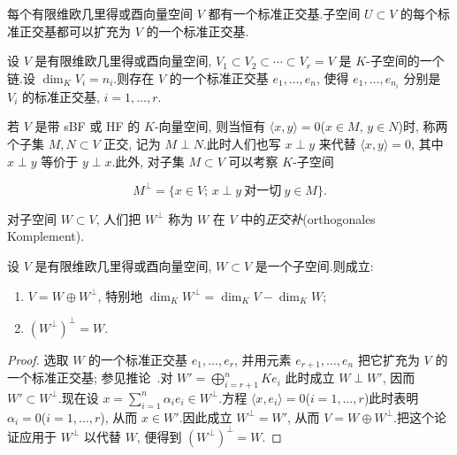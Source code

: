 \begin{corollary}\label{cor:7.2.6}
每个有限维欧几里得或酉向量空间 $V$ 都有一个标准正交基.子空间 $U \subset V$ 的每个标准正交基都可以扩充为 $V$ 的一个标准正交基.
\end{corollary}

\begin{corollary}\label{cor:7.2.7}
设 $V$ 是有限维欧几里得或酉向量空间, $V_1 \subset V_2 \subset \cdots \subset V_r = V$ 是 $K$-子空间的一个链.设 $\dim_K V_i = n_i$.则存在 $V$ 的一个标准正交基 $e_1, \ldots, e_n$, 使得 $e_1, \ldots, e_{n_i}$ 分别是 $V_i$ 的标准正交基, $i = 1, \ldots, r$.
\end{corollary}

若 $V$ 是带 sBF 或 HF 的 $K$-向量空间, 则当恒有 $\langle x, y \rangle = 0$($x \in M$, $y \in N$)时, 称两个子集 $M, N \subset V$ 正交, 记为 $M \perp N$.此时人们也写 $x \perp y$ 来代替 $\langle x, y \rangle = 0$, 其中 $x \perp y$ 等价于 $y \perp x$.此外, 对子集 $M \subset V$ 可以考察 $K$-子空间

\[
M^{\perp} = \bigl\{x \in V;\, x \perp y \ \text{对一切} \ y \in M\bigr\}\text{.}
\]

对子空间 $W \subset V$, 人们把 $W^{\perp}$ 称为 $W$ 在 $V$ 中的\emph{正交补}(\textup{orthogonales Komplement}).

\begin{corollary}[正交补]\label{cor:7.2.8}
设 $V$ 是有限维欧几里得或酉向量空间, $W \subset V$ 是一个子空间.则成立:
\begin{enumerate}
\item[(i)] $V = W \oplus W^{\perp}$, 特别地 $\dim_K W^{\perp} = \dim_K V - \dim_K W$;
\item[(ii)] $(W^{\perp})^{\perp} = W$.
\end{enumerate}
\end{corollary}

\begin{proof}
选取 $W$ 的一个标准正交基 $e_1, \ldots, e_r$, 并用元素 $e_{r+1}, \ldots, e_n$ 把它扩充为 $V$ 的一个标准正交基; 参见推论~.对 $W' = \bigoplus_{i = r+1}^{n} K e_i$ 此时成立 $W \perp W'$, 因而 $W' \subset W^{\perp}$.现在设 $x = \sum_{i = 1}^{n} \alpha_i e_i \in W^{\perp}$.方程 $\langle x, e_i \rangle = 0$($i = 1, \ldots, r$)此时表明 $\alpha_i = 0$($i = 1, \ldots, r$), 从而 $x \in W'$.因此成立 $W^{\perp} = W'$, 从而 $V = W \oplus W^{\perp}$.把这个论证应用于 $W^{\perp}$ 以代替 $W$, 便得到 $(W^{\perp})^{\perp} = W$.
\end{proof}

